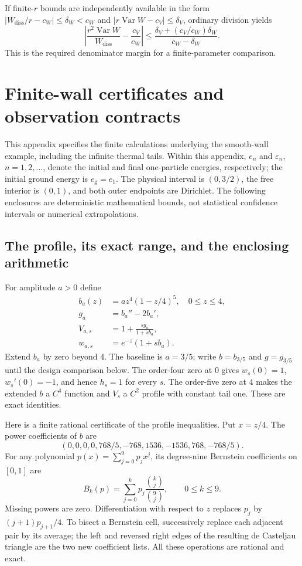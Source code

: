\documentclass[aps,pra,reprint,superscriptaddress,longbibliography]{revtex4-2}
\newcommand{\Var}{\operatorname{Var}}
\newcommand{\Wd}{W_{\mathrm{diss}}}
\begin{document}
If finite-$r$ bounds are independently available in the form $|\Wd/r-c_W|\le\delta_W<c_W$ and $|r\Var W-c_V|\le\delta_V$, ordinary division yields
\begin{equation}
 \left|\frac{r^2\Var W}{\Wd}-\frac{c_V}{c_W}\right|
 \le\frac{\delta_V+(c_V/c_W)\delta_W}{c_W-\delta_W}.
 \label{eq:ratioerror}
\end{equation}
This is the required denominator margin for a finite-parameter comparison.

\section{Finite-wall certificates and observation contracts}
\label{app:numerical}

This appendix specifies the finite calculations underlying the smooth-wall
example, including the infinite thermal tails.  Within this appendix,
$e_n$ and $\varepsilon_n$, $n=1,2,\ldots$, denote the initial and final
one-particle energies, respectively; the initial ground energy is
$e_{\mathrm g}=e_1$.  The physical interval is
$(0,3/2)$, the free interior is $(0,1)$, and both outer endpoints are
Dirichlet.  The following enclosures are deterministic mathematical bounds,
not statistical confidence intervals or numerical extrapolations.

\subsection{The profile, its exact range, and the enclosing arithmetic}

For amplitude $a>0$ define
\begin{align}
 b_a(z)&=a z^4(1-z/4)^5,\quad 0\le z\le4,\nonumber\\
 g_a&=b_a''-2b_a',\nonumber\\
 V_{a,s}&=1+\frac{s g_a}{1+s b_a},\nonumber\\
 w_{a,s}&=e^{-z}(1+s b_a).
 \label{eq:nc-profile}
\end{align}
Extend $b_a$ by zero beyond $4$.  The baseline is $a=3/5$; write
$b=b_{3/5}$ and $g=g_{3/5}$ until the design comparison below.
The order-four zero at $0$ gives $w_s(0)=1$, $w_s'(0)=-1$, and hence
$h_s=1$ for every $s$.  The order-five zero at $4$ makes the extended
$b$ a $C^4$ function and $V_s$ a $C^2$ profile with constant tail one.
These are exact identities.

Here is a finite rational certificate of the profile inequalities.
Put $x=z/4$.  The power coefficients of $b$ are
\[
 (0,0,0,0,768/5,-768,1536,-1536,768,-768/5).
\]
For any polynomial $p(x)=\sum_{j=0}^9p_jx^j$, its degree-nine Bernstein
coefficients on $[0,1]$ are
\begin{equation}
 B_k(p)=\sum_{j=0}^k p_j\frac{\binom{k}{j}}{\binom9j},
 \qquad 0\le k\le9.
 \label{eq:nc-bernstein}
\end{equation}
Missing powers are zero.  Differentiation with respect to $z$ replaces
$p_j$ by $(j+1)p_{j+1}/4$.  To bisect a Bernstein cell, successively
replace each adjacent pair by its average; the left and reversed right
edges of the resulting de Casteljau triangle are the two new coefficient
lists.  All these operations are rational and exact.
\end{document}
